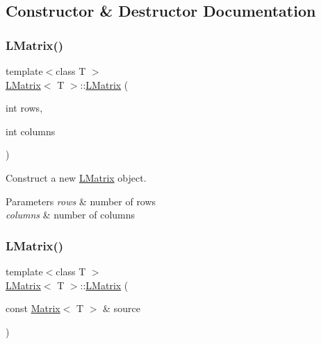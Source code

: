 \subsection{Constructor \& Destructor Documentation}
\mbox{\label{class_l_matrix_a5e031d95fcb4ce79894c52488d224f98}} 
\subsubsection{\texorpdfstring{LMatrix()}{LMatrix()}\hspace{0.1cm}{\footnotesize\ttfamily [1/3]}}
{\footnotesize\ttfamily template$<$class T $>$ \\
\mbox{\hyperlink{class_l_matrix}{L\+Matrix}}$<$ T $>$\+::\mbox{\hyperlink{class_l_matrix}{L\+Matrix}} (\begin{DoxyParamCaption}\item[{int}]{rows,  }\item[{int}]{columns }\end{DoxyParamCaption})}



Construct a new \mbox{\hyperlink{class_l_matrix}{L\+Matrix}} object. 


\begin{DoxyParams}{Parameters}
{\em rows} & number of rows \\
\hline
{\em columns} & number of columns \\
\hline
\end{DoxyParams}
\mbox{\label{class_l_matrix_aa4bc8aa349207a09c467d958d7361b4b}} 
\subsubsection{\texorpdfstring{LMatrix()}{LMatrix()}\hspace{0.1cm}{\footnotesize\ttfamily [2/3]}}
{\footnotesize\ttfamily template$<$class T $>$ \\
\mbox{\hyperlink{class_l_matrix}{L\+Matrix}}$<$ T $>$\+::\mbox{\hyperlink{class_l_matrix}{L\+Matrix}} (\begin{DoxyParamCaption}\item[{const \mbox{\hyperlink{class_matrix}{Matrix}}$<$ T $>$ \&}]{source }\end{DoxyParamCaption})}



